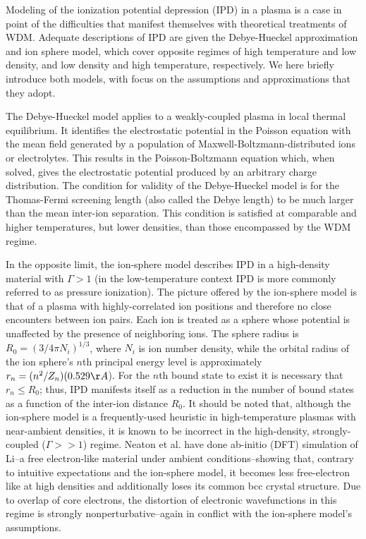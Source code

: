 \documentclass [11pt, proquest, article] {uwthesis}[2016/11/22]
\begin{document}
Modeling of the ionization potential depression (IPD) in a plasma is a case in point of the difficulties that manifest themselves with theoretical treatments of WDM. Adequate descriptions of IPD are given the Debye-Hueckel approximation and ion sphere model, which cover opposite regimes of high temperature and low density, and low density and high temperature, respectively. We here briefly introduce both models, with focus on the assumptions and approximations that they adopt.

The Debye-Hueckel model applies to a weakly-coupled plasma in local thermal equilibrium. It identifies the electrostatic potential in the Poisson equation with the mean field generated by a population of Maxwell-Boltzmann-distributed ions or electrolytes. This results in the Poisson-Boltzmann equation which, when solved, gives the electrostatic potential produced by an arbitrary charge distribution. The condition for validity of the Debye-Hueckel model is for the Thomas-Fermi screening length (also called the Debye length) to be much larger than the mean inter-ion separation. This condition is satisfied at comparable and higher temperatures, but lower densities, than those encompassed by the WDM regime. \cite{smith1964bound} %

In the opposite limit, the ion-sphere model describes IPD in a high-density material with $\Gamma > 1$ (in the low-temperature context IPD is more commonly referred to as pressure ionization). The picture offered by the ion-sphere model is that of a plasma with highly-correlated ion positions and therefore no close encounters between ion pairs. Each ion is treated as a sphere whose potential is unaffected by the presence of neighboring ions. \cite{stewart1966lowering} The sphere radius is $R_0 = (3/4 \pi N_i)^{1/3}$, where $N_i$ is ion number density, while the orbital radius of the ion sphere's $n$th principal energy level is approximately $r_n = (n^2/Z_n)(0.529 \AA$). For the $n$th bound state to exist it is necessary that $r_n \leq R_0$; thus, IPD manifests itself as a reduction in the number of bound states as a function of the inter-ion distance $R_0$. It should be noted that, although the ion-sphere model is a frequently-used heuristic in high-temperature plasmas with near-ambient densities, it is known to be incorrect in the high-density, strongly-coupled ($\Gamma >> 1$) regime. Neaton et al. have done ab-initio (DFT) simulation of Li--a free electron-like material under ambient conditions--showing that, contrary to intuitive expectations and the ion-sphere model, it becomes less free-electron like at high densities and additionally loses its common bcc crystal structure. \cite{neaton1999pairing} Due to overlap of core electrons, the distortion of electronic wavefunctions in this regime is strongly nonperturbative--again in conflict with the ion-sphere model's assumptions. 
\end{document}
